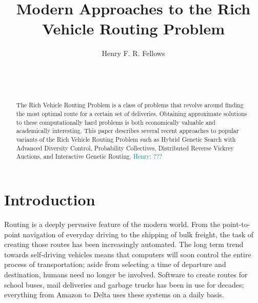 \documentclass{sig-alternate}
\newcommand{\allcomments}[1]{{#1}}
\newcommand{\hfcomment}[1]{\textcolor{Teal}{\allcomments{Henry: {#1}}}}
\begin{document}

\title{Modern Approaches to the Rich Vehicle Routing Problem}


\author{
\alignauthor
Henry F. R. Fellows\\
	\\
	\\
	\\
}

\maketitle
\begin{abstract}

The Rich Vehicle Routing Problem is a class of problems that revolve around finding the most optimal route for a certain set of deliveries. Obtaining approximate solutions to these computationally hard problems is both economically valuable and academically interesting. This paper describes several recent approaches to popular variants of the Rich Vehicle Routing Problem such as Hybrid Genetic Search with Advanced Diversity Control, Probability Collectives, Distributed Reverse Vickrey Auctions, and Interactive Genetic Routing. \hfcomment{???}

\end{abstract}


\section{Introduction}
\label{sec:intro}
Routing is a deeply pervasive feature of the modern world. From the point-to-point navigation of everyday driving to the shipping of bulk freight, the task of creating those routes has been increasingly automated. The long term trend towards self-driving vehicles means that computers will soon control the entire process of transportation; aside from selecting a time of departure and destination, humans need no longer be involved. Software to create routes for school buses, mail deliveries and garbage trucks has been in use for decades; everything from Amazon to Delta uses these systems on a daily basis. 
\end{document}
